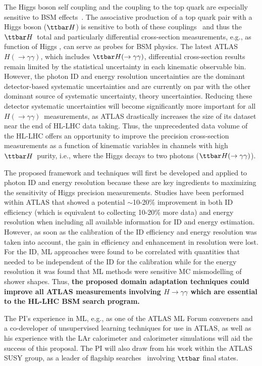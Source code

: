 \documentclass[letter, USenglish, 11pt, subfigure]{article}
\newcommand{\tth}{\ensuremath{\ttbar H}}
\newcommand{\tthyy}{\ensuremath{\ttbar H(\to\gamma\gamma)}}
\newcommand{\hyy}{\ensuremath{H(\to\gamma\gamma)}}
\begin{document}
The Higgs boson self coupling and the coupling to the top quark are especially sensitive to BSM effects~\cite{Agrawal_2020}. The associative production of a top quark pair with a Higgs boson (\tth) is sensitive to both of these couplings~\cite{Maltoni_2017} and thus the \tth\ total and particularly differential cross-section measurements, e.g., as function of Higgs \pt, can serve as probes for BSM physics. The latest ATLAS \hyy, which includes \tthyy, differential cross-section results~\cite{ATLAS_STXS} remain limited by the statistical uncertainty in each kinematic observable bin. However, the photon ID and energy resolution uncertainties are the dominant detector-based systematic uncertainties and are currently on par with the other dominant source of systematic uncertainty, theory uncertainties. Reducing these detector systematic uncertainties will become significantly more important for all \hyy\ measurements, as ATLAS drastically increases the size of its dataset near the end of HL-LHC data taking. Thus, the unprecedented data volume of the HL-LHC offers an opportunity to improve the precision cross-section measurements as a function of kinematic variables in channels with high \tth\ purity, i.e., where the Higgs decays to two photons (\tthyy).

The proposed framework and techniques will first be developed and applied to photon ID and energy resolution because these are key ingredients to maximizing the sensitivity of Higgs precision measurements. Studies have been performed within ATLAS that showed a potential $\sim$10-20\% improvement in both ID efficiency (which is equivalent to collecting 10-20\% more data) and energy resolution when including all available information for ID and energy estimation. However, as soon as the calibration of the ID efficiency and energy resolution was taken into account, the gain in efficiency and enhancement in resolution were lost. For the ID, ML approaches were found to be correlated with quantities that needed to be independent of the ID for the calibration while for the energy resolution it was found that ML methods were sensitive MC mismodelling of shower shapes. Thus, {\bf the proposed domain adaptation techniques could improve all ATLAS measurements involving $H\to\gamma\gamma$ which are essential to the HL-LHC BSM search program.}

The PI's experience in ML, e.g., as one of the ATLAS ML Forum conveners and a co-developer of unsupervised learning techniques for use in ATLAS, as well as his experience with the LAr calorimeter and calorimeter simulations will aid the success of this proposal. The PI will also draw from his work within the ATLAS SUSY group, as a leader of flagship searches~\cite{stop0L_1,stopRun1,stop0L_2,stop0L_3} involving $\ttbar$ final states. 
\end{document}
